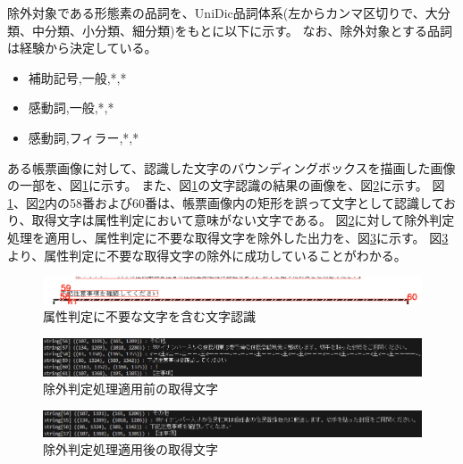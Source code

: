除外対象である形態素の品詞を、UniDic品詞体系(左からカンマ区切りで、大分類、中分類、小分類、細分類)をもとに以下に示す。
なお、除外対象とする品詞は経験から決定している。

\begin{itemize}
    \item 補助記号,一般,*,*
    \item 感動詞,一般,*,*
    \item 感動詞,フィラー,*,*
\end{itemize}

ある帳票画像に対して、認識した文字のバウンディングボックスを描画した画像の一部を、図\ref{fig:before_exclusion_bbox}に示す。
また、図\ref{fig:before_exclusion_bbox}の文字認識の結果の画像を、図\ref{fig:before_exclusion_string}に示す。
図\ref{fig:before_exclusion_bbox}、図\ref{fig:before_exclusion_string}内の58番および60番は、帳票画像内の矩形を誤って文字として認識しており、取得文字は属性判定において意味がない文字である。
図\ref{fig:before_exclusion_string}に対して除外判定処理を適用し、属性判定に不要な取得文字を除外した出力を、図\ref{fig:after_exclusion_string}に示す。
図\ref{fig:after_exclusion_string}より、属性判定に不要な取得文字の除外に成功していることがわかる。

\begin{figure}[t]
    \begin{center}
        \includegraphics[width=15cm]{image/04-implementation/before_exclusion_bbox.png}
        \caption{属性判定に不要な文字を含む文字認識}
        \label{fig:before_exclusion_bbox}
    \end{center}
\end{figure}

\begin{figure}[t]
    \begin{center}
        \includegraphics[width=15cm]{image/04-implementation/before_exclusion_string.png}
        \caption{除外判定処理適用前の取得文字}
        \label{fig:before_exclusion_string}
    \end{center}
\end{figure}

\begin{figure}[t]
    \begin{center}
        \includegraphics[width=15cm]{image/04-implementation/after_exclusion_string.png}
        \caption{除外判定処理適用後の取得文字}
        \label{fig:after_exclusion_string}
    \end{center}
\end{figure}


